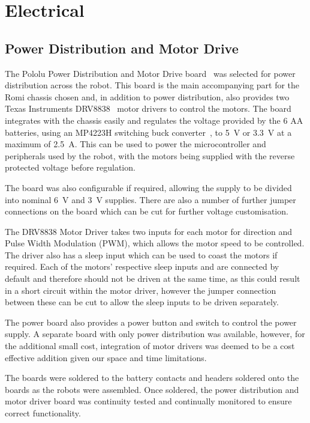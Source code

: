 
\chapter{Electrical}\label{electrical}

\section{Power Distribution and Motor Drive}\label{elec/poweranddrive}
The Pololu Power Distribution and Motor Drive board~\cite{pololupower}
was selected for power distribution across
the robot. This board is the main accompanying part for the Romi
chassis chosen and, in addition to power distribution, also provides
two Texas Instruments DRV8838~\cite{texasdrivers} motor drivers to control
the motors. The board integrates with the chassis easily
and regulates the voltage provided by the 6 AA batteries, using an
MP4223H switching buck converter~\cite{mpbuck}, to \SI{5}{\volt} or
\SI{3.3}{\volt} at a maximum of \SI{2.5}{\ampere}. This can be used
to power the microcontroller and peripherals used by the robot, with the
motors being supplied with the reverse protected voltage before regulation.

The board was also configurable if required, allowing the supply to be
divided into nominal \SI{6}{\volt} and \SI{3}{\volt} supplies. There are also a number of further jumper
connections on the board which can be cut for further voltage customisation.

The DRV8838 Motor Driver takes two inputs for each motor for direction and Pulse
Width Modulation (PWM), which allows the motor speed to be controlled. The
driver also has a sleep input which can be used to coast the motors if
required. Each of the motors' respective sleep inputs
and are connected by default and therefore should not be driven at the same time,
as this could result in a short circuit within the motor driver, however the
jumper connection between these can be cut to allow the sleep inputs to
be driven separately.

The power board also provides a power button and switch to control the
power supply. A separate board with only power distribution was
available, however, for the additional small cost, integration of
motor drivers was deemed to be a cost effective addition given our
space and time limitations.

The boards were soldered to the battery contacts and headers soldered
onto the boards as the robots were assembled. Once soldered, the power
distribution and motor driver board was continuity tested and continually monitored to ensure correct functionality.

